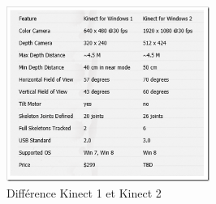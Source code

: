 \begin{figure}
  \begin{center}
    \includegraphics[width=250px]{images/Kinect1vs2.png}
    \caption{Différence Kinect 1 et Kinect 2}
    \label{fig:kinect1vs2}
  \end{center}
\end{figure}

